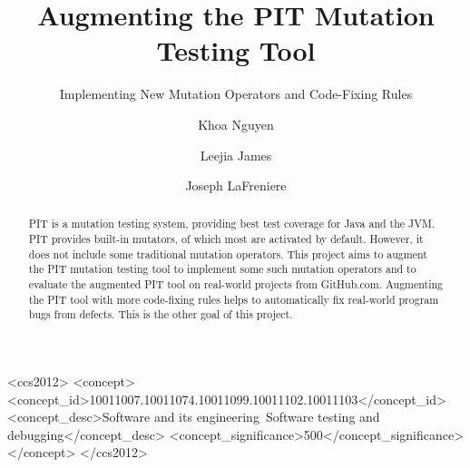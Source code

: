\documentclass[sigconf]{acmart}
\begin{document}
\title{Augmenting the PIT Mutation Testing Tool}
\subtitle{Implementing New Mutation Operators and Code-Fixing Rules}


\author{Khoa Nguyen}

\author{Leejia James}

\author{Joseph LaFreniere}

\begin{abstract}
PIT is a mutation testing system, providing best test coverage for Java and the JVM.
PIT provides built-in mutators, of which most are activated by default.
However, it does not include some traditional mutation operators.
This project aims to augment the PIT mutation testing tool to implement some such mutation operators and to evaluate the augmented PIT tool on real-world projects from GitHub.com.
Augmenting the PIT tool with more code-fixing rules helps to automatically fix real-world program bugs from defects.
This is the other goal of this project.
\end{abstract}

%
%
\begin{CCSXML}
  <ccs2012>
  <concept>
  <concept_id>10011007.10011074.10011099.10011102.10011103</concept_id>
  <concept_desc>Software and its engineering~Software testing and debugging</concept_desc>
  <concept_significance>500</concept_significance>
  </concept>
  </ccs2012>
\end{CCSXML}




\maketitle







\end{document}
